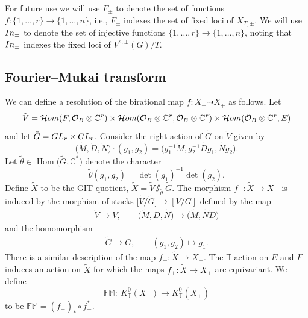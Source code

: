 \documentclass[11pt]{article}
\numberwithin{equation}{section}
\numberwithin{equation}{section}
\newcommand{\cc}[1]{\mathcal{#1}} %
\newcommand{\CC}{\mathbb{C}}
\newcommand{\torus}{\mathbb{T}}
\newcommand{\FM}{\mathbb{FM}}
\DeclareMathOperator{\Hom}{Hom}
\newcommand{\F}{F}
\newcommand{\E}{E}
\begin{document}
For future use we will use $F_\pm$ to denote the set of functions $f\colon \{1, \dots, r\} \to \{1, \dots, n\}$, i.e., $F_\pm$ indexes the set of fixed loci of $X_{T, \pm}$. We will use ${\rm In}_\pm$ to denote the set of injective functions $\{1, \dots, r\} \to \{1, \dots, n\}$, noting that ${\rm In}_\pm$ indexes the fixed loci of $V^{s, \pm}(G)/T.$



\subsection{Fourier--Mukai transform}\label{s:FM}
We can define a resolution of the birational map
$f\colon X_{-} \dashrightarrow X_{+}$
as follows. Let
\[
\tilde V = \mathcal{H}{\rm om}(\F, \cc O_B \otimes \CC^r) \times \mathcal{H}{\rm om}(\cc O_B \otimes \CC^r, \cc O_B \otimes \CC^r) \times \mathcal{H}{\rm om}(\cc O_B \otimes \CC^r, \E)
\]
and let $\tilde G = {\rm GL}_r \times {\rm GL}_r$. Consider the right action of $\tilde G$ on $\tilde V$ given by
\[
\bigl(\tilde M, \tilde D, \tilde N\bigr) \cdot (g_1, g_2)= \bigl( g_1^{-1}\tilde M , g_2^{-1}\tilde D g_1, \tilde Ng_2\bigr).
\]
Let $\tilde \theta \in \Hom\bigl(\tilde G, \CC^*\bigr)$ denote the character
\[
\tilde \theta(g_1, g_2) = \det(g_1)^{-1} \det(g_2).
\]
Define $\tilde X$ to be the GIT quotient,
$\tilde X = \tilde V \sslash_{\tilde \theta} \tilde G$.
The morphism $f_{-}\colon \tilde X \to X_{-}$ is induced by the morphism of stacks
$\bigl[\tilde V/\tilde G\bigr] \to [V/G]$
defined by the map
\begin{align*}
 \tilde V \to V, \qquad
 \bigl(\tilde M, \tilde D, \tilde N\bigr) \mapsto \bigl(\tilde M, \tilde N \tilde D\bigr)
\end{align*}
and the homomorphism
\begin{align*}
 \tilde G \to G ,\qquad
 (g_1, g_2) \mapsto g_1.
\end{align*}
There is a similar description of the map $f_{+}\colon \tilde X \to X_{+}.$
The $\torus$-action on $E$ and $F$ induces an action on $\tilde X$ for which the maps $f_\pm\colon \tilde X \to X_\pm$ are equivariant. We define
\begin{equation}\label{Kmap}
\FM\colon \ K^0_\torus(X_{-}) \to K^0_\torus(X_{+})
\end{equation}
to be $\FM = (f_{+})_* \circ f_{-}^*.$
\end{document}
